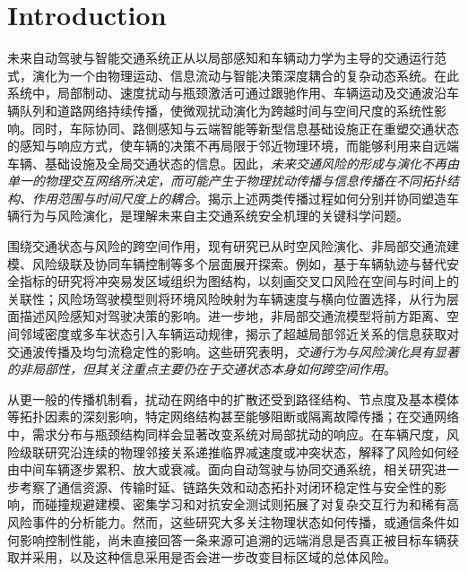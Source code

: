 \documentclass[10pt,a4paper,twocolumn]{article}
\title{\revYellow{交通风险传播中的“类超距作用”：信息介导的非最近邻效应}}
\author{禹尧珅}
\date{}
\newcommand{\revYellow}[1]{#1}
\newcommand{\revBlue}[1]{#1}
\begin{document}
\maketitle

\begin{abstract}
\end{abstract}

\section*{Introduction}
\revYellow{未来自动驾驶与智能交通系统正从以局部感知和车辆动力学为主导的交通运行范式，演化为一个由物理运动、信息流动与智能决策深度耦合的复杂动态系统。在此系统中，局部制动、速度扰动与瓶颈激活可通过跟驰作用、车辆运动及交通波沿车辆队列和道路网络持续传播，使微观扰动演化为跨越时间与空间尺度的系统性影响\cite{saberi2020contagion}\cite{duan2023bottlenecks}。同时，车际协同、路侧感知与云端智能等新型信息基础设施正在重塑交通状态的感知与响应方式，使车辆的决策不再局限于邻近物理环境，而能够利用来自远端车辆、基础设施及全局交通状态的信息\cite{wang2025delays}。因此，\textit{未来交通风险的形成与演化不再由单一的物理交互网络所决定，而可能产生于物理扰动传播与信息传播在不同拓扑结构、作用范围与时间尺度上的耦合}。揭示上述两类传播过程如何分别并协同塑造车辆行为与风险演化，是理解未来自主交通系统安全机理的关键科学问题。}

\revBlue{围绕交通状态与风险的跨空间作用，现有研究已从时空风险演化、非局部交通流建模、风险级联及协同车辆控制等多个层面展开探索。例如，基于车辆轨迹与替代安全指标的研究将冲突易发区域组织为图结构，以刻画交叉口风险在空间与时间上的关联性\cite{wang2024conflict}；风险场驾驶模型则将环境风险映射为车辆速度与横向位置选择，从行为层面描述风险感知对驾驶决策的影响\cite{kolekar2020risk}。进一步地，非局部交通流模型将前方距离、空间邻域密度或多车状态引入车辆运动规律，揭示了超越局部邻近关系的信息获取对交通波传播及均匀流稳定性的影响\cite{sun2020lookahead}\cite{huang2022nonlocal}。这些研究表明，\textit{交通行为与风险演化具有显著的非局部性，但其关注重点主要仍在于交通状态本身如何跨空间作用}。}

\revBlue{从更一般的传播机制看，扰动在网络中的扩散还受到路径结构、节点度及基本模体等拓扑因素的深刻影响，特定网络结构甚至能够阻断或隔离故障传播\cite{bao2022motifs}\cite{kaiser2021isolators}；在交通网络中，需求分布与瓶颈结构同样会显著改变系统对局部扰动的响应\cite{hamedmoghadam2021percolation}。在车辆尺度，风险级联研究沿连续的物理邻接关系递推临界减速度或冲突状态，解释了风险如何经由中间车辆逐步累积、放大或衰减\cite{luo2026crm}。面向自动驾驶与协同交通系统，相关研究进一步考察了通信资源、传输时延、链路失效和动态拓扑对闭环稳定性与安全性的影响\cite{razzaghpour2023controlaware}\cite{wang2024topology}，而碰撞规避建模、密集学习和对抗安全测试则拓展了对复杂交互行为和稀有高风险事件的分析能力\cite{schumann2026collision,feng2026dense,xu2026ga2ad}。然而，这些研究大多关注物理状态如何传播，或通信条件如何影响控制性能，尚未直接回答一条来源可追溯的远端消息是否真正被目标车辆获取并采用，以及这种信息采用是否会进一步改变目标区域的总体风险。}
\end{document}
